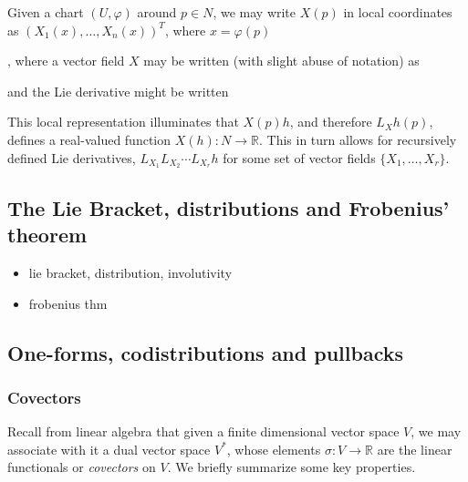 \documentclass[psamsfonts]{amsart}
\theoremstyle{definition}
\theoremstyle{remark}
\newcommand*\R{\mathds{R}}
\numberwithin{equation}{section}
\begin{document}
{Given a chart $(U, \varphi)$ around $p\in N$, we may write $X(p)$ in local coordinates as $(X_1(x), \dots, X_n(x))^T$, where $x = \varphi(p)$



, where a vector field $X$ may be written (with slight abuse of notation) as

 and the Lie derivative might be written 


This local representation illuminates that $X(p)h$, and therefore $L_Xh(p)$, defines a real-valued function $X(h):N\rightarrow \R$. This in turn allows for recursively defined Lie derivatives, $L_{X_{1}}L_{X_{2}}\cdots L_{X_{r}}h$ for some set of vector fields $\{X_1, \dots , X_r\}$.


}

\subsection{The Lie Bracket, distributions and Frobenius' theorem}\label{sec:prelim-frobenius}

{\color{blue}
\begin{itemize}
    \item lie bracket, distribution, involutivity
    \item frobenius thm
\end{itemize}

}



\subsection{One-forms, codistributions and pullbacks}

\subsubsection{Covectors}

Recall from linear algebra that given a finite dimensional vector space $V$, we may associate with it a dual vector space $V^*$, whose elements $\sigma : V \rightarrow \R$ are the linear functionals or \textit{covectors} on $V$. We briefly summarize some key properties. 
\end{document}
